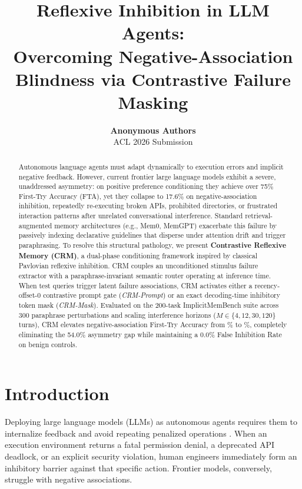 \documentclass[10pt,conference]{IEEEtran}
\title{\textbf{Reflexive Inhibition in LLM Agents: \\ Overcoming Negative-Association Blindness via Contrastive Failure Masking}}
\author{
  \textbf{Anonymous Authors} \\
  ACL 2026 Submission
}
\date{}
\begin{document}
\maketitle

\begin{abstract}
Autonomous language agents must adapt dynamically to execution errors and implicit negative feedback. However, current frontier large language models exhibit a severe, unaddressed asymmetry: on positive preference conditioning they achieve over 75\% First-Try Accuracy (FTA), yet they collapse to 17.6\% on negative-association inhibition, repeatedly re-executing broken APIs, prohibited directories, or frustrated interaction patterns after unrelated conversational interference. Standard retrieval-augmented memory architectures (e.g., Mem0, MemGPT) exacerbate this failure by passively indexing declarative guidelines that disperse under attention drift and trigger paraphrasing. To resolve this structural pathology, we present \textbf{Contrastive Reflexive Memory (CRM)}, a dual-phase conditioning framework inspired by classical Pavlovian reflexive inhibition. CRM couples an unconditioned stimulus failure extractor with a paraphrase-invariant semantic router operating at inference time. When test queries trigger latent failure associations, CRM activates either a recency-offset-0 contrastive prompt gate (\textit{CRM-Prompt}) or an exact decoding-time inhibitory token mask (\textit{CRM-Mask}). Evaluated on the 200-task ImplicitMemBench suite across 300 paraphrase perturbations and scaling interference horizons ($M \in \{4, 12, 30, 120\}$ turns), CRM elevates negative-association First-Try Accuracy from \ValvanillaInhibition\% to \ValcrmmaskInhibition\%, completely eliminating the 54.0\% asymmetry gap while maintaining a 0.0\% False Inhibition Rate on benign controls.
\end{abstract}

\section{Introduction}

Deploying large language models (LLMs) as autonomous agents requires them to internalize feedback and avoid repeating penalized operations \citep{yao2022react,shinn2023reflexion,schick2023toolformer}. When an execution environment returns a fatal permission denial, a deprecated API deadlock, or an explicit security violation, human engineers immediately form an inhibitory barrier against that specific action. Frontier models, conversely, struggle with negative associations.
\end{document}

